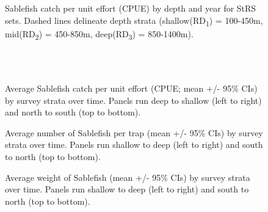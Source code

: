 \documentclass[12pt]{article}\usepackage[]{graphicx}\usepackage[]{color}
\begin{document}
\begin{figure}[htb]

{\centering {} 

}

\caption{Sablefish catch per unit effort (CPUE) by depth and year for StRS sets. Dashed lines delineate depth strata (shallow(RD\textsubscript{1}) = 100-450m, mid(RD\textsubscript{2}) = 450-850m, deep(RD\textsubscript{3}) = 850-1400m).}\label{fig:figure5}
\end{figure}
\clearpage

~\\
\hspace*{0.333em}\\

\begin{figure}[htb]

{\centering {} 

}

\caption{Average Sablefish catch per unit effort (CPUE; mean +/- 95\% CIs) by survey strata over time. Panels run deep to shallow (left to right) and north to south (top to bottom).}\label{fig:figure6}
\end{figure}

\begin{figure}[htb]

{\centering {} 

}

\caption{Average number of Sablefish per trap (mean +/- 95\% CIs) by survey strata over time. Panels run shallow to deep (left to right) and south to north (top to bottom).}\label{fig:figure7}
\end{figure}

\begin{figure}[htb]

{\centering {} 

}

\caption{Average weight of Sablefish (mean +/- 95\% CIs) by survey strata over time. Panels run shallow to deep (left to right) and south to north (top to bottom).}\label{fig:figure8}
\end{figure}
\end{document}
